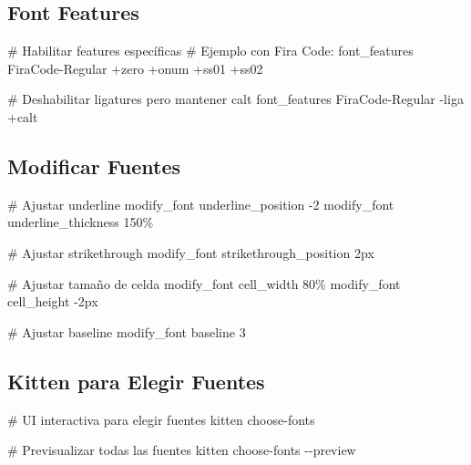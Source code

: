 \documentclass[
  doc,
  floatsintext,
  longtable,
  a4paper,
  nolmodern,
  notxfonts,
  notimes,
  12pt,
  colorlinks=true,linkcolor=blue,citecolor=blue,urlcolor=blue]{apa7}
\newenvironment{Shaded}{\begin{snugshade}}{\end{snugshade}}
\newcommand{\AttributeTok}[1]{\textcolor[rgb]{0.40,0.45,0.13}{#1}}
\newcommand{\CommentTok}[1]{\textcolor[rgb]{0.37,0.37,0.37}{#1}}
\newcommand{\DataTypeTok}[1]{\textcolor[rgb]{0.68,0.00,0.00}{#1}}
\newcommand{\ErrorTok}[1]{\textcolor[rgb]{0.68,0.00,0.00}{#1}}
\newcommand{\ExtensionTok}[1]{\textcolor[rgb]{0.00,0.23,0.31}{#1}}
\newcommand{\NormalTok}[1]{\textcolor[rgb]{0.00,0.23,0.31}{#1}}
\begin{document}
\subsection{Font Features}\label{font-features}

\begin{Shaded}
\begin{Highlighting}[]
\CommentTok{\# Habilitar features específicas}
\CommentTok{\# Ejemplo con Fira Code:}
\DataTypeTok{font\_features} \DataTypeTok{FiraCode{-}Regular} \ErrorTok{+}\DataTypeTok{zero} \ErrorTok{+}\DataTypeTok{onum} \ErrorTok{+}\DataTypeTok{ss01} \ErrorTok{+}\DataTypeTok{ss02}

\CommentTok{\# Deshabilitar ligatures pero mantener calt}
\DataTypeTok{font\_features} \DataTypeTok{FiraCode{-}Regular} \DataTypeTok{{-}liga} \ErrorTok{+}\DataTypeTok{calt}
\end{Highlighting}
\end{Shaded}

\subsection{Modificar Fuentes}\label{modificar-fuentes}

\begin{Shaded}
\begin{Highlighting}[]
\CommentTok{\# Ajustar underline}
\DataTypeTok{modify\_font} \DataTypeTok{underline\_position} \DataTypeTok{{-}2}
\DataTypeTok{modify\_font} \DataTypeTok{underline\_thickness} \DataTypeTok{150}\ErrorTok{\%}

\CommentTok{\# Ajustar strikethrough}
\DataTypeTok{modify\_font} \DataTypeTok{strikethrough\_position} \DataTypeTok{2px}

\CommentTok{\# Ajustar tamaño de celda}
\DataTypeTok{modify\_font} \DataTypeTok{cell\_width} \DataTypeTok{80}\ErrorTok{\%}
\DataTypeTok{modify\_font} \DataTypeTok{cell\_height} \DataTypeTok{{-}2px}

\CommentTok{\# Ajustar baseline}
\DataTypeTok{modify\_font} \DataTypeTok{baseline} \DataTypeTok{3}
\end{Highlighting}
\end{Shaded}

\subsection{Kitten para Elegir
Fuentes}\label{kitten-para-elegir-fuentes}

\begin{Shaded}
\begin{Highlighting}[]
\CommentTok{\# UI interactiva para elegir fuentes}
\ExtensionTok{kitten}\NormalTok{ choose{-}fonts}

\CommentTok{\# Previsualizar todas las fuentes}
\ExtensionTok{kitten}\NormalTok{ choose{-}fonts }\AttributeTok{{-}{-}preview}
\end{Highlighting}
\end{Shaded}
\end{document}
